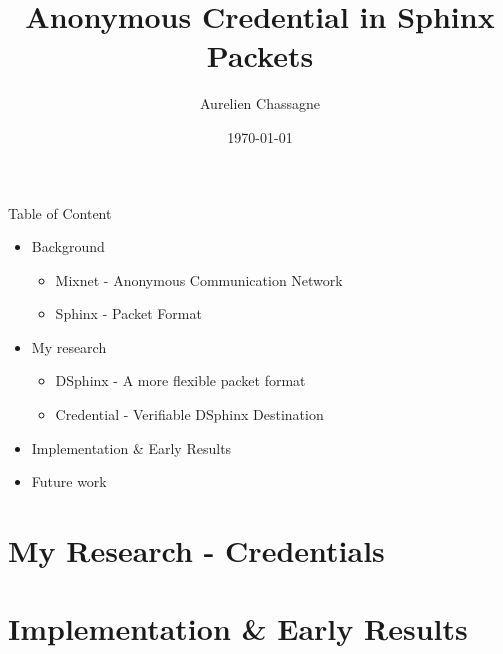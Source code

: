 \documentclass[aspectratio=169]{beamer}
\title{Anonymous Credential in Sphinx Packets}
\author{Aurelien Chassagne}
\date{\today}
\begin{document}
\begin{frame}
  \titlepage
\end{frame}

\begin{frame}{Table of Content}
\begin{itemize}
  \setlength\itemsep{5mm}
  \item Background
  \begin{itemize}
    \item Mixnet - Anonymous Communication Network
    \item Sphinx - Packet Format
  \end{itemize}
  \item My research
  \begin{itemize}
    \item DSphinx - A more flexible packet format
    \item Credential - Verifiable DSphinx Destination
  \end{itemize}
  \item Implementation \& Early Results
  \item Future work
\end{itemize}
\end{frame}

% 
% 

% 
% 

\section{My Research - Credentials}



% 

\section{Implementation \& Early Results}


\end{document}
